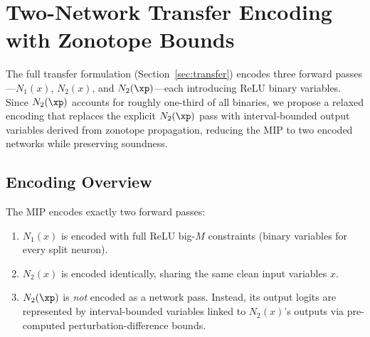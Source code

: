 \section{Two-Network Transfer Encoding with Zonotope Bounds}
\label{sec:no_n2_xp}

The full transfer formulation (Section~\ref{sec:transfer}) encodes three forward passes---$N_1(x)$, $N_2(x)$, and $N_2(\xp)$---each introducing ReLU binary variables. Since $N_2(\xp)$ accounts for roughly one-third of all binaries, we propose a relaxed encoding that replaces the explicit $N_2(\xp)$ pass with interval-bounded output variables derived from zonotope propagation, reducing the MIP to two encoded networks while preserving soundness.

\subsection{Encoding Overview}

The MIP encodes exactly two forward passes:

\begin{center}
\end{center}

\begin{enumerate}
  \item \textbf{$N_1(x)$} is encoded with full ReLU big-$M$ constraints (binary variables for every split neuron).
  \item \textbf{$N_2(x)$} is encoded identically, sharing the same clean input variables $x$.
  \item \textbf{$N_2(\xp)$} is \emph{not} encoded as a network pass. Instead, its output logits are represented by interval-bounded variables linked to $N_2(x)$'s outputs via pre-computed perturbation-difference bounds.
\end{enumerate}

